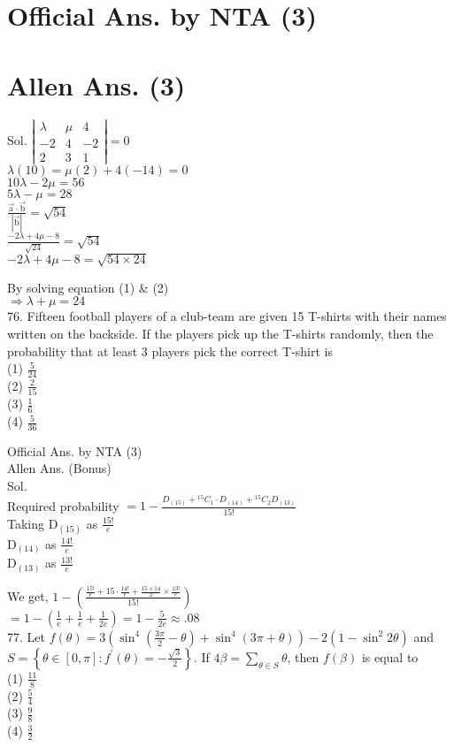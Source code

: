 \documentclass[10pt]{article}
\begin{document}
\section*{Official Ans. by NTA (3)}
\section*{Allen Ans. (3)}
Sol. \(\left|\begin{array}{ccc}\lambda & \mu & 4 \\ -2 & 4 & -2 \\ 2 & 3 & 1\end{array}\right|=0\)\\
\(\lambda(10)=\mu(2)+4(-14)=0\)\\
\(10 \lambda-2 \mu=56\)\\
\(5 \lambda-\mu=28\)\\
\(\frac{\overrightarrow{\mathrm{a}} \cdot \overrightarrow{\mathrm{b}}}{|\overrightarrow{\mathrm{b}}|}=\sqrt{54}\)\\
\(\frac{-2 \lambda+4 \mu-8}{\sqrt{24}}=\sqrt{54}\)\\
\(-2 \lambda+4 \mu-8=\sqrt{54 \times 24}\)

By solving equation (1) \& (2)\\
\(\Rightarrow \lambda+\mu=24\)\\
76. Fifteen football players of a club-team are given 15 T-shirts with their names written on the backside. If the players pick up the T-shirts randomly, then the probability that at least 3 players pick the correct T-shirt is\\
(1) \(\frac{5}{24}\)\\
(2) \(\frac{2}{15}\)\\
(3) \(\frac{1}{6}\)\\
(4) \(\frac{5}{36}\)

Official Ans. by NTA (3)\\
Allen Ans. (Bonus)\\
Sol.\\
Required probability \(=1-\frac{D_{(15)}+{ }^{15} C_{1} \cdot D_{(14)}+{ }^{15} C_{2} D_{(13)}}{15!}\)\\
Taking \(\mathrm{D}_{(15)}\) as \(\frac{15!}{e}\)\\
\(\mathrm{D}_{(14)}\) as \(\frac{14!}{e}\)\\
\(\mathrm{D}_{(13)}\) as \(\frac{13!}{e}\)

We get, \(1-\left(\frac{\frac{15!}{e}+15 \cdot \frac{14!}{e}+\frac{15 \times 14}{2} \times \frac{13!}{e}}{15!}\right)\)\\
\(=1-\left(\frac{1}{e}+\frac{1}{e}+\frac{1}{2 e}\right)=1-\frac{5}{2 e} \approx .08\)\\
77. Let \(f(\theta)=3\left(\sin ^{4}\left(\frac{3 \pi}{2}-\theta\right)+\sin ^{4}(3 \pi+\theta)\right)-2\left(1-\sin ^{2} 2 \theta\right)\) and \(S=\left\{\theta \in[0, \pi]: f^{\prime}(\theta)=-\frac{\sqrt{3}}{2}\right\}\). If \(4 \beta=\sum_{\theta \in S} \theta\), then \(f(\beta)\) is equal to\\
(1) \(\frac{11}{8}\)\\
(2) \(\frac{5}{4}\)\\
(3) \(\frac{9}{8}\)\\
(4) \(\frac{3}{2}\)
\end{document}
